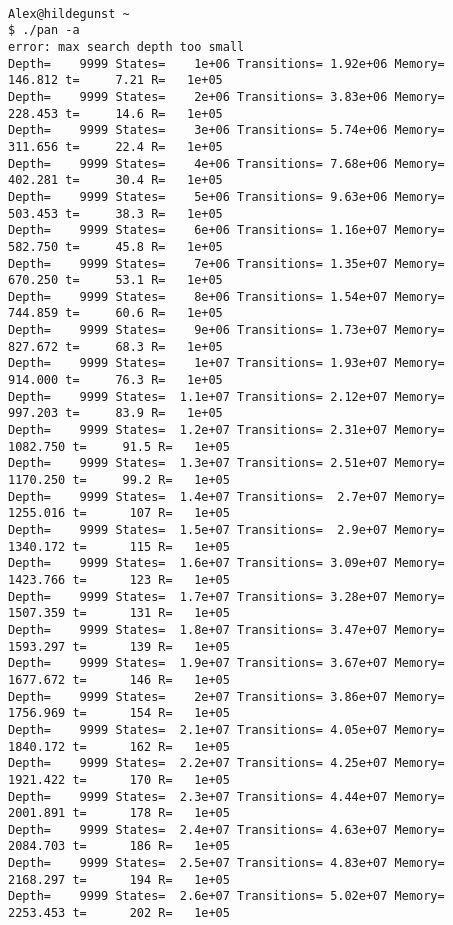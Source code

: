 \documentclass{llncs}
\begin{document}
\begin{lstlisting}

Alex@hildegunst ~
$ ./pan -a
error: max search depth too small
Depth=    9999 States=    1e+06 Transitions= 1.92e+06 Memory=   146.812 t=     7.21 R=   1e+05
Depth=    9999 States=    2e+06 Transitions= 3.83e+06 Memory=   228.453 t=     14.6 R=   1e+05
Depth=    9999 States=    3e+06 Transitions= 5.74e+06 Memory=   311.656 t=     22.4 R=   1e+05
Depth=    9999 States=    4e+06 Transitions= 7.68e+06 Memory=   402.281 t=     30.4 R=   1e+05
Depth=    9999 States=    5e+06 Transitions= 9.63e+06 Memory=   503.453 t=     38.3 R=   1e+05
Depth=    9999 States=    6e+06 Transitions= 1.16e+07 Memory=   582.750 t=     45.8 R=   1e+05
Depth=    9999 States=    7e+06 Transitions= 1.35e+07 Memory=   670.250 t=     53.1 R=   1e+05
Depth=    9999 States=    8e+06 Transitions= 1.54e+07 Memory=   744.859 t=     60.6 R=   1e+05
Depth=    9999 States=    9e+06 Transitions= 1.73e+07 Memory=   827.672 t=     68.3 R=   1e+05
Depth=    9999 States=    1e+07 Transitions= 1.93e+07 Memory=   914.000 t=     76.3 R=   1e+05
Depth=    9999 States=  1.1e+07 Transitions= 2.12e+07 Memory=   997.203 t=     83.9 R=   1e+05
Depth=    9999 States=  1.2e+07 Transitions= 2.31e+07 Memory=  1082.750 t=     91.5 R=   1e+05
Depth=    9999 States=  1.3e+07 Transitions= 2.51e+07 Memory=  1170.250 t=     99.2 R=   1e+05
Depth=    9999 States=  1.4e+07 Transitions=  2.7e+07 Memory=  1255.016 t=      107 R=   1e+05
Depth=    9999 States=  1.5e+07 Transitions=  2.9e+07 Memory=  1340.172 t=      115 R=   1e+05
Depth=    9999 States=  1.6e+07 Transitions= 3.09e+07 Memory=  1423.766 t=      123 R=   1e+05
Depth=    9999 States=  1.7e+07 Transitions= 3.28e+07 Memory=  1507.359 t=      131 R=   1e+05
Depth=    9999 States=  1.8e+07 Transitions= 3.47e+07 Memory=  1593.297 t=      139 R=   1e+05
Depth=    9999 States=  1.9e+07 Transitions= 3.67e+07 Memory=  1677.672 t=      146 R=   1e+05
Depth=    9999 States=    2e+07 Transitions= 3.86e+07 Memory=  1756.969 t=      154 R=   1e+05
Depth=    9999 States=  2.1e+07 Transitions= 4.05e+07 Memory=  1840.172 t=      162 R=   1e+05
Depth=    9999 States=  2.2e+07 Transitions= 4.25e+07 Memory=  1921.422 t=      170 R=   1e+05
Depth=    9999 States=  2.3e+07 Transitions= 4.44e+07 Memory=  2001.891 t=      178 R=   1e+05
Depth=    9999 States=  2.4e+07 Transitions= 4.63e+07 Memory=  2084.703 t=      186 R=   1e+05
Depth=    9999 States=  2.5e+07 Transitions= 4.83e+07 Memory=  2168.297 t=      194 R=   1e+05
Depth=    9999 States=  2.6e+07 Transitions= 5.02e+07 Memory=  2253.453 t=      202 R=   1e+05

\end{lstlisting}
\end{document}
